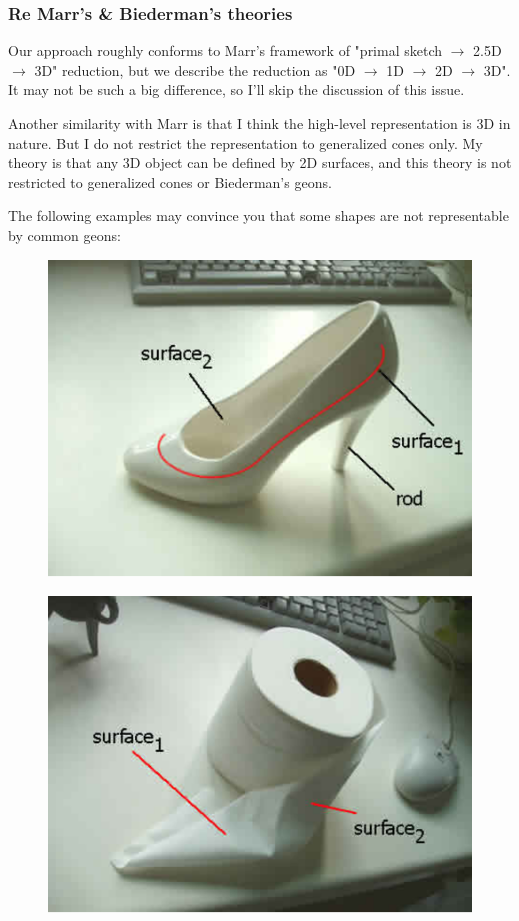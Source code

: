 \subsubsection{Re Marr's \& Biederman's theories}

Our approach roughly conforms to Marr's framework of  "primal sketch $\rightarrow$ 2.5D $\rightarrow$ 3D" reduction, but we describe the reduction as "0D $\rightarrow$ 1D $\rightarrow$ 2D $\rightarrow$ 3D". It may not be such a big difference, so I'll skip the discussion of this issue.

Another similarity with Marr is that I think the high-level representation is 3D in nature. But I do not restrict the representation to generalized cones only. My theory is that any 3D object can be defined by 2D surfaces, and this theory is not restricted to generalized cones or Biederman's geons.

The following examples may convince you that some shapes are not representable by common geons:

\begin{figure}[H]
\centering
\includegraphics[scale=0.7]{HighHeelAnalysis.png}
\end{figure}

\begin{figure}[H]
\centering
\includegraphics[scale=0.7]{ToiletRollAnalysis.png}
\end{figure}

